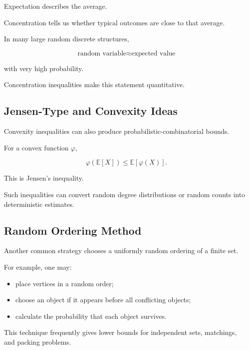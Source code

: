Expectation describes the average.

Concentration tells us whether typical outcomes are close to that
average.

In many large random discrete structures,

\[
\boxed{
\text{random variable}
\approx
\text{expected value}
}
\]

with very high probability.

Concentration inequalities make this statement quantitative.

\subsection{Jensen-Type and Convexity Ideas}
\label{subsec:convexity-probabilistic-combinatorics}

Convexity inequalities can also produce probabilistic-combinatorial
bounds.

For a convex function \(\varphi\),

\[
\boxed{
\varphi(\mathbb{E}[X])
\leq
\mathbb{E}[\varphi(X)].
}
\]

This is Jensen's inequality.

Such inequalities can convert random degree distributions or random
counts into deterministic estimates.

\subsection{Random Ordering Method}
\label{subsec:random-ordering-method}

Another common strategy chooses a uniformly random ordering of a finite
set.

For example, one may:

\begin{itemize}
    \item place vertices in a random order;
    \item choose an object if it appears before all conflicting objects;
    \item calculate the probability that each object survives.
\end{itemize}

This technique frequently gives lower bounds for independent sets,
matchings, and packing problems.


